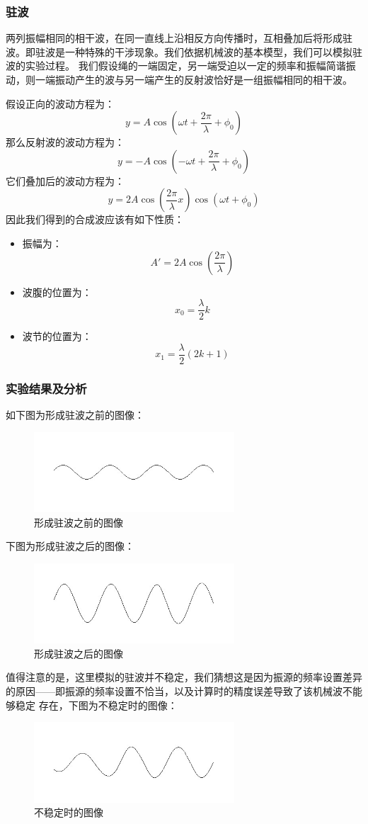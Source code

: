 ﻿\documentclass{article}
\begin{document}
	\subsubsection*{驻波}
	两列振幅相同的相干波，在同一直线上沿相反方向传播时，互相叠加后将形成驻波。即驻波是一种特殊的干涉现象。我们依据机械波的基本模型，我们可以模拟驻波的实验过程。
	我们假设绳的一端固定，另一端受迫以一定的频率和振幅简谐振动，则一端振动产生的波与另一端产生的反射波恰好是一组振幅相同的相干波。\par
	假设正向的波动方程为：
	\[y=A\cos\left(\omega t+\frac{2\pi}{\lambda}+\phi_0\right)\]
	那么反射波的波动方程为：
	\[y=-A\cos\left(-\omega t+\frac{2\pi}{\lambda}+\phi_0\right)\]
	它们叠加后的波动方程为：
	\[y=2A\cos\left(\frac{2\pi}{\lambda}x\right)\cos(\omega t+\phi_0)\]
	因此我们得到的合成波应该有如下性质：
	\begin{itemize}
		\item 振幅为：
		\[A'=2A\cos\left(\frac{2\pi}{\lambda}\right)\]
		\item 波腹的位置为：
		\[x_0=\frac{\lambda}{2}k\]
		\item 波节的位置为：
		\[x_1=\frac{\lambda}{2}(2k+1)\]
	\end{itemize}
	\subsubsection{实验结果及分析}
	如下图为形成驻波之前的图像：
	\begin{figure}[H]
		\centering
		\includegraphics[height=3cm]{1.jpg}
		\caption{形成驻波之前的图像}
	\end{figure}
	下图为形成驻波之后的图像：
	\begin{figure}[H]
		\centering
		\includegraphics[height=3cm]{2.jpg}
		\caption{形成驻波之后的图像}
	\end{figure}
	值得注意的是，这里模拟的驻波并不稳定，我们猜想这是因为振源的频率设置差异的原因——即振源的频率设置不恰当，以及计算时的精度误差导致了该机械波不能够稳定
	存在，下图为不稳定时的图像：
	\begin{figure}[H]
		\centering
		\includegraphics[height=3cm]{3.jpg}
		\caption{不稳定时的图像}
	\end{figure}
\end{document}
